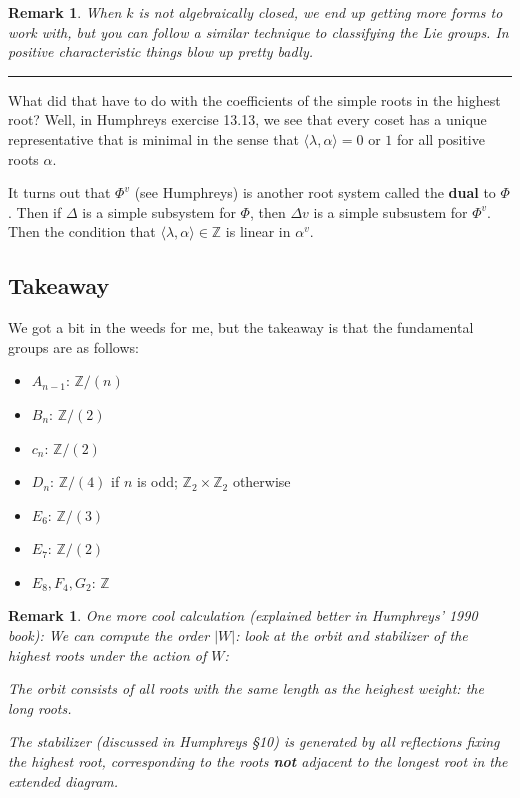 \documentclass[12pt]{article}
\theoremstyle{nonumberbreak}
\theoremstyle{changebreak}
\theoremstyle{nonumberbreak}
\theoremstyle{change}
\newtheorem{rmk}[thm]{Remark}
\newcommand*{\Z}{
\mathbb{Z}
}
\newcommand*{\brk}{
\rule{2in}{.1pt}
}
\begin{document}
\begin{rmk}
	When $k$ is not algebraically closed, we end up getting more forms to work with, but you can follow
	a similar technique to classifying the Lie groups. In positive characteristic things blow up pretty badly.
\end{rmk}

\brk

What did that have to do with the coefficients of the simple roots in the highest root? Well, in Humphreys exercise 13.13,
we see that every coset has a unique representative that is minimal in the sense that $\langle\lambda,\alpha\rangle=0$ or $1$ for all positive roots
$\alpha.$

It turns out that $\Phi^v$ (see Humphreys) is another root system called the \textbf{dual} to $\Phi$. Then if 
$\Delta$ is a simple subsystem for $\Phi$, then $\Delta v$ is a simple subsustem for $\Phi^v$. Then the condition
that $\langle\lambda,\alpha\rangle\in\Z$ is linear in $\alpha^v$.

\subsection{Takeaway}
We got a bit in the weeds for me, but the takeaway is that the fundamental groups are as follows:
\begin{itemize}
	\item $A_{n-1}$: $\Z/(n)$
	\item $B_n$: $\Z/(2)$
	\item $c_n$: $\Z/(2)$
	\item $D_n$: $\Z/(4)$ if $n$ is odd; $\Z_2\times\Z_2$ otherwise
	\item $E_6$: $\Z/(3)$
	\item $E_7$: $\Z/(2)$
	\item $E_8,F_4,G_2$: $\Z$
\end{itemize}

\begin{rmk}
	One more cool calculation (explained better in Humphreys' 1990 book): We can compute the order $|W|$:
	look at the orbit and stabilizer of the highest roots under the action of $W$: 

	The orbit consists of all roots with the same length as the heighest weight: the long roots.

	The stabilizer (discussed in Humphreys \S 10) is generated by all reflections fixing the highest root, corresponding to the roots \textbf{not}
	adjacent to the longest root in the extended diagram.
\end{rmk}
\end{document}
